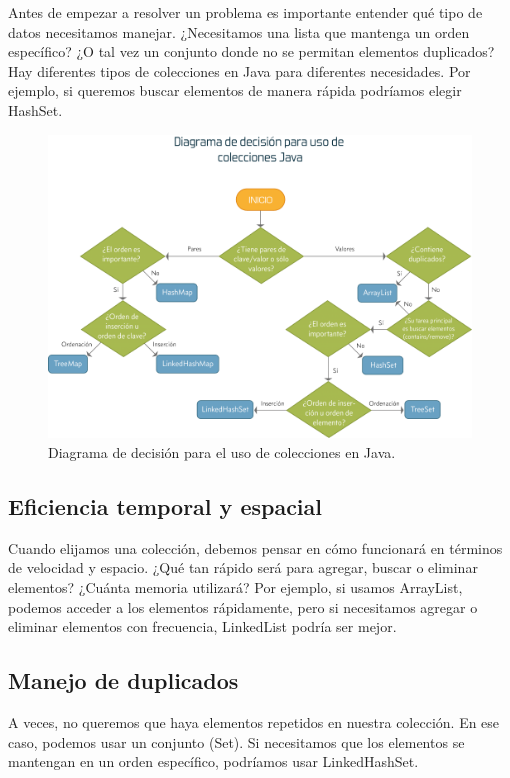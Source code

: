 \documentclass[a4paper,12pt]{article}
\begin{document}
Antes de empezar a resolver un problema es importante entender qué tipo de datos necesitamos manejar. ¿Necesitamos una lista que mantenga un orden específico? ¿O tal vez un conjunto donde no se permitan elementos duplicados? Hay diferentes tipos de colecciones en Java para diferentes necesidades. Por ejemplo, si queremos buscar elementos de manera rápida podríamos elegir HashSet.

\begin{figure}[ht]
    \centering
    \includegraphics[width=.9\textwidth]{media/diagrama_decision_uso_de_colecciones.png}
    \caption{Diagrama de decisión para el uso de colecciones en Java. \cite{amor-2020}}
    \label{fig:diagrama_decision_colecciones}
\end{figure}

\subsection{Eficiencia temporal y espacial}

Cuando elijamos una colección, debemos pensar en cómo funcionará en términos de velocidad y espacio. ¿Qué tan rápido será para agregar, buscar o eliminar elementos? ¿Cuánta memoria utilizará? Por ejemplo, si usamos ArrayList, podemos acceder a los elementos rápidamente, pero si necesitamos agregar o eliminar elementos con frecuencia, LinkedList podría ser mejor.

\subsection{Manejo de duplicados}

A veces, no queremos que haya elementos repetidos en nuestra colección. En ese caso, podemos usar un conjunto (Set). Si necesitamos que los elementos se mantengan en un orden específico, podríamos usar LinkedHashSet.
\end{document}
